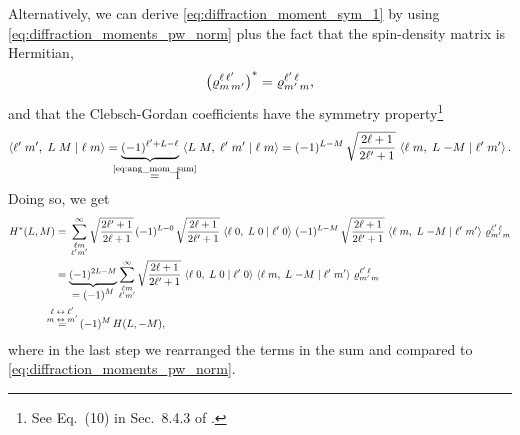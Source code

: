 Alternatively, we can derive \cref{eq:diffraction_moment_sym_1} by
using \cref{eq:diffraction_moments_pw_norm} plus the fact that the
spin-density matrix is Hermitian,
\ie
\begin{equation}
  \rBrk[1]{\varrho^{\ell\, \ell'}_{m\, m'}}^*
  = \varrho^{\ell'\, \ell}_{m'\, m},
\end{equation}
and that the Clebsch-Gordan coefficients have the symmetry
property\footnote{See Eq.~(10) in Sec.~8.4.3 of
.}
\begin{equation}
  \label{eq:clebsch_sym}
  \clebsch{\ell'}{m'}{L}{M}{\ell}{m}
  = \rdUnderbrace{(-1)^{\ell' + L - \ell}}{\equalUsing{$\mathclap{\text{\cref{eq:ang_mom_sum}}}$}\quad 1}\,
  \clebsch{L}{M}{\ell'}{m'}{\ell}{m}
  = (-1)^{L - M}\, \sqrt{\frac{2 \ell + 1}{2 \ell' + 1}}\, \clebsch{\ell}{m}{L}{-M}{\ell'}{m'}.
\end{equation}
Doing so, we get
\begin{align}
  H^*(L, M)
  ={}& \sum_{\substack{\ell m \\ \ell' m'}}^\infty
    \sqrt{\frac{2 \ell' + 1}{2 \ell + 1}}\,
    (-1)^{L - 0}\, \sqrt{\frac{2 \ell + 1}{2 \ell' + 1}}\, \clebsch{\ell}{0}{L}{0}{\ell'}{0}\,
    (-1)^{L - M}\, \sqrt{\frac{2 \ell + 1}{2 \ell' + 1}}\, \clebsch{\ell}{m}{L}{-M}{\ell'}{m'}\,
    \varrho^{\ell'\, \ell}_{m'\, m} \nonumber
  \\
  ={}& \dUnderbrace{(-1)^{2 L - M}}{= (-1)^M}
  \sum_{\substack{\ell m \\ \ell' m'}}^\infty
  \sqrt{\frac{2 \ell + 1}{2 \ell' + 1}}\,
  \clebsch{\ell}{0}{L}{0}{\ell'}{0}\, \clebsch{\ell}{m}{L}{-M}{\ell'}{m'}\,
  \varrho^{\ell'\, \ell}_{m'\, m}
  \\
  \equalUsing{$\mathclap{\substack{\displaystyle{\ell \leftrightarrow \ell'} \\ \displaystyle{m \leftrightarrow m'}}}$}{}& \quad
  (-1)^M\, H(L, -M),
\end{align}
where in the last step we rearranged the terms in the sum and compared
to \cref{eq:diffraction_moments_pw_norm}.

